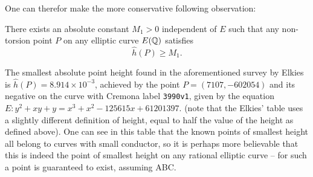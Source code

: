 One can therefor make the more conservative following observation:
\begin{corollary}[ABC]\label{conj:point_height_lower_bound}
There exists an absolute constant $M_1 >0$ independent of $E$ such that any non-torsion point $P$ on any elliptic curve $E(\mathbb{Q})$ satisfies
\begin{equation}\label{eqn:Elkies_height_lower_bound}
\hat{h}(P) \ge M_1 .
\end{equation}
\end{corollary}
The smallest absolute point height found in the aforementioned survey by Elkies is $\hat{h}(P) = 8.914\times 10^{-3}$, achieved by the point $P = (7107,-602054)$ and its negative on the curve with Cremona label {\tt 3990v1}, given by the equation $E: y^2+xy+y=x^3+x^2-125615x+61201397$. (note that the Elkies' table uses a slightly different definition of height, equal to half the value of the height as defined above). One can see in this table that the known points of smallest height all belong to curves with small conductor, so it is perhaps more believable that this is indeed the point of smallest height on any rational elliptic curve -- for such a point is guaranteed to exist, assuming ABC. \\

